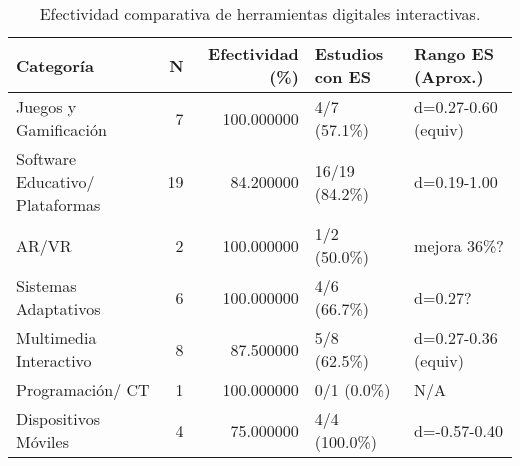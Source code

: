 \begin{table}
\caption{Efectividad comparativa de herramientas digitales interactivas.}
\label{tab:efectividad_herramientas}
\begin{tabular}{lrrll}
\toprule
Categoría & N & Efectividad (\%) & Estudios con ES & Rango ES (Aprox.) \\
\midrule
Juegos y Gamificación & 7 & 100.000000 & 4/7 (57.1\%) & d=0.27-0.60 (equiv) \\
Software Educativo/ Plataformas & 19 & 84.200000 & 16/19 (84.2\%) & d=0.19-1.00 \\
AR/VR & 2 & 100.000000 & 1/2 (50.0\%) & mejora 36\%? \\
Sistemas Adaptativos & 6 & 100.000000 & 4/6 (66.7\%) & d=0.27? \\
Multimedia Interactivo & 8 & 87.500000 & 5/8 (62.5\%) & d=0.27-0.36 (equiv) \\
Programación/ CT & 1 & 100.000000 & 0/1 (0.0\%) & N/A \\
Dispositivos Móviles & 4 & 75.000000 & 4/4 (100.0\%) & d=-0.57-0.40 \\
\bottomrule
\end{tabular}
\end{table}

